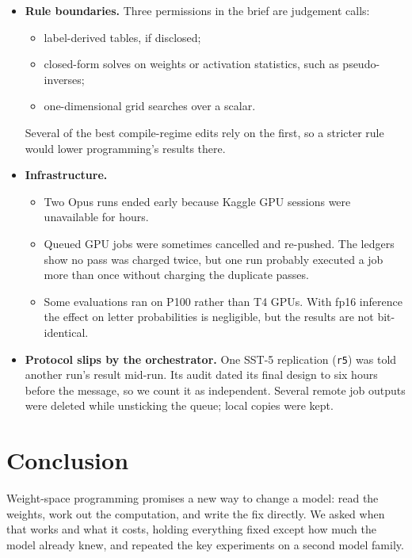 \begin{itemize}
  \item \textbf{Rule boundaries.} Three permissions in the brief are judgement calls:
  \begin{itemize}
    \item label-derived tables, if disclosed;
    \item closed-form solves on weights or activation statistics, such as pseudo-inverses;
    \item one-dimensional grid searches over a scalar.
  \end{itemize}
  Several of the best compile-regime edits rely on the first, so a stricter rule would lower programming's results there.
  \item \textbf{Infrastructure.}
  \begin{itemize}
    \item Two Opus runs ended early because Kaggle GPU sessions were unavailable for hours.
    \item Queued GPU jobs were sometimes cancelled and re-pushed. The ledgers show no pass was charged twice, but one run probably executed a job more than once without charging the duplicate passes.
    \item Some evaluations ran on P100 rather than T4 GPUs. With fp16 inference the effect on letter probabilities is negligible, but the results are not bit-identical.
  \end{itemize}
  \item \textbf{Protocol slips by the orchestrator.} One SST-5 replication (\texttt{r5}) was told another run's result mid-run. Its audit dated its final design to six hours before the message, so we count it as independent. Several remote job outputs were deleted while unsticking the queue; local copies were kept.
\end{itemize}

\section{Conclusion}
Weight-space programming promises a new way to change a model: read the weights, work out the computation, and write the fix directly. We asked when that works and what it costs, holding everything fixed except how much the model already knew, and repeated the key experiments on a second model family.

